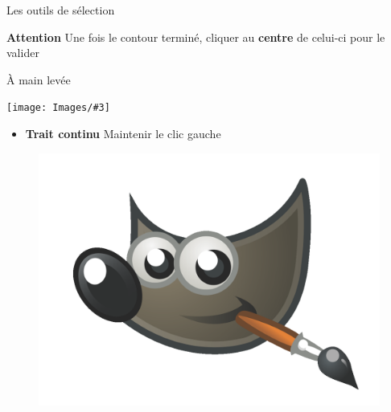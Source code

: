 \documentclass[10pt,svgnames,usenames,table]{beamer}
\newcommand{\tool}[3]{%
	\begin{minipage}{0.40\textwidth}
	\item #1	
	\end{minipage}\hfill
	\begin{minipage}{0.20\textwidth}
	\begin{flushright}
	\keys{#2}
	\end{flushright}
	\end{minipage}
	\begin{minipage}{0.06\textwidth}
	\fbox{ou}
	\end{minipage}
	\begin{minipage}{0.1\textwidth}
	\texttt{[image: Images/\#3]}
	\end{minipage}
}
\begin{document}
\begin{frame}[allowframebreaks]{Les outils de sélection}
\begin{enumerate}
	\vspace{0.4cm}
	\textbf{Attention} Une fois le contour terminé, cliquer au \textbf{centre} de celui-ci pour le valider
	
	\framebreak
	
	\tool{À main levée}{F}{freeSelect.png}

	\begin{itemize}
		\item \textbf{Trait continu} Maintenir le clic gauche 
	\end{itemize}
	
		\begin{minipage}{0.45\textwidth}
		\begin{figure}
        		\centering
        		\includegraphics[width=\textwidth]{Images/gimp-logo.png} 
		\end{figure}
		\end{minipage}\hfill
		\begin{minipage}{0.45\textwidth}
		\begin{figure}
        		\centering

\end{figure}
\end{minipage}
\end{enumerate}
\end{frame}
\end{document}
